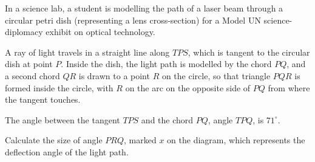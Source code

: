 \begin{question}
\noindent In a science lab, a student is modelling the path of a laser beam through a circular petri dish (representing a lens cross-section) for a Model UN science-diplomacy exhibit on optical technology.

\noindent A ray of light travels in a straight line along $TPS$, which is tangent to the circular dish at point $P$. Inside the dish, the light path is modelled by the chord $PQ$, and a second chord $QR$ is drawn to a point $R$ on the circle, so that triangle $PQR$ is formed inside the circle, with $R$ on the arc on the opposite side of $PQ$ from where the tangent touches.

\noindent The angle between the tangent $TPS$ and the chord $PQ$, angle $TPQ$, is $71^\circ$.

\begin{center}
\end{center}

\noindent Calculate the size of angle $PRQ$, marked $x$ on the diagram, which represents the deflection angle of the light path.

\vspace{5cm}

\begin{flushright}
\end{flushright}
\end{question}